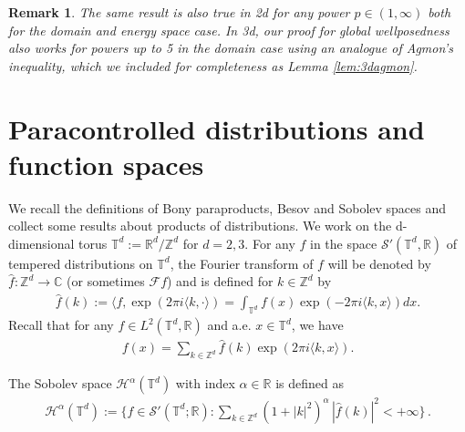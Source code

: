 \documentclass[11pt, oneside]{article}   	%
\newtheorem{remark}[theorem]{Remark}
\newcommand{\ssp}{\mathscr{H}}
\begin{document}
\begin{remark}\upshape\label{rem:wave3ddiffpower}\upshape
The same result is also true in 2d for any power $p\in(1,\infty)$ both for the domain and energy space case. In 3d, our proof for global wellposedness also works for powers up to 5 in the domain case using an analogue of Agmon's inequality, which we included for completeness as Lemma \ref{lem:3dagmon}.
\end{remark}

\appendix
\section{Paracontrolled distributions and function spaces}
We recall the definitions of Bony paraproducts, Besov and Sobolev spaces 
and collect some results about products of distributions.
We work on the d-dimensional torus $\mathbb{T}^d:= \mathbb{R}^d/\mathbb{Z}^d$ for $d=2,3$.   
For any $f$ in the space $\mathscr {S}' ( \mathbb T^d,\mathbb R)$ of tempered distributions on $\mathbb{T}^d$, the Fourier transform of $f$ will be 
denoted by
$\hat{f} : \mathbb{Z}^d\to \mathbb{C}$ (or sometimes $\mathscr{F}f$) and is defined for $k\in \mathbb{Z}^d$ by
\begin{align*}
\hat{f}(k) := \langle f,\exp(2\pi i \langle k, \cdot\rangle) = \int_{\mathbb{T}^d} f(x) \exp(- 2\pi i\langle k,x\rangle) dx. 
\end{align*}
Recall that for any $f\in L^2(\mathbb{T}^d,\mathbb{R})$ and a.e. $x\in \mathbb{T}^d$, 
we have 
\begin{align}\label{decomposition-fourier}
f(x)=\sum_{k \in \mathbb{Z}^d} \hat{f}(k) \exp( 2\pi i\langle k,x\rangle). 
\end{align}

The Sobolev space $\ssp^\alpha(\mathbb T^d)$ with index $\alpha\in \mathbb{R}$ is defined as  
\begin{align*}
\ssp^\alpha(\mathbb {T}^d) := \{f \in \mathscr {S}' ( \mathbb {T}^d;\mathbb R): 
\sum_{k\in \mathbb{Z}^d} (1+|k|^2)^\alpha \, |\hat{f}(k)|^2 < +\infty\}\,. 
\end{align*}   
\end{document}
